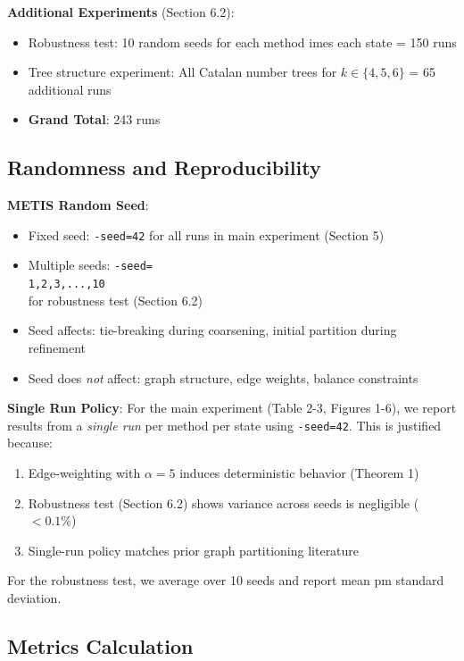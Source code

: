 \textbf{Additional Experiments} (Section 6.2):
\begin{itemize}
    \item Robustness test: 10 random seeds for each method 	imes each state = 150 runs
    \item Tree structure experiment: All Catalan number trees for $k \in \{4,5,6\}$ = 65 additional runs
    \item \textbf{Grand Total}: 243 runs
\end{itemize}

\subsection{Randomness and Reproducibility}

\textbf{METIS Random Seed}:
\begin{itemize}
    \item Fixed seed: \texttt{-seed=42} for all runs in main experiment (Section 5)
    \item Multiple seeds: \texttt{-seed=\\{1,2,3,...,10\\}} for robustness test (Section 6.2)
    \item Seed affects: tie-breaking during coarsening, initial partition during refinement
    \item Seed does \textit{not} affect: graph structure, edge weights, balance constraints
\end{itemize}

\textbf{Single Run Policy}:
For the main experiment (Table 2-3, Figures 1-6), we report results from a \textit{single run} per method per state using \texttt{-seed=42}. This is justified because:
\begin{enumerate}
    \item Edge-weighting with $\alpha = 5$ induces deterministic behavior (Theorem 1)
    \item Robustness test (Section 6.2) shows variance across seeds is negligible ($< 0.1\%$)
    \item Single-run policy matches prior graph partitioning literature~\cite{karypis1998fast,karypis2000multilevel}
\end{enumerate}

For the robustness test, we average over 10 seeds and report mean pm standard deviation.

\subsection{Metrics Calculation}

